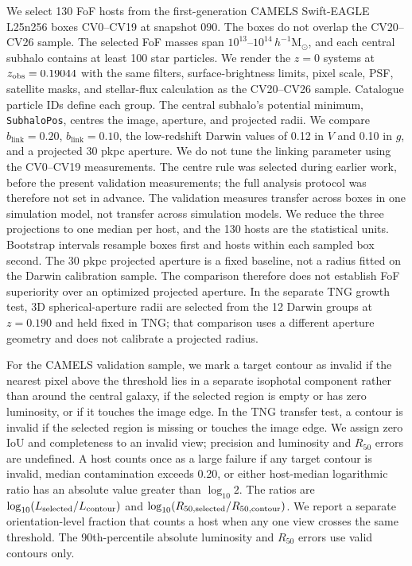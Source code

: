 \documentclass[usenatbib]{mnras}
\begin{document}
We select 130 FoF hosts from the first-generation CAMELS Swift-EAGLE
L25n256 boxes CV0--CV19 at snapshot 090. The boxes do not overlap the
CV20--CV26 sample. The selected FoF masses span
$10^{13}$--$10^{14}\,h^{-1}\mathrm{M}_{\odot}$, and each central subhalo
contains at least 100 star particles. We render the $z=0$ systems at
$z_{\rm obs}=0.19044$ with the same filters, surface-brightness limits,
pixel scale, PSF, satellite masks, and stellar-flux calculation as the
CV20--CV26 sample. Catalogue particle IDs define each group. The central
subhalo's potential minimum, \texttt{SubhaloPos}, centres the image,
aperture, and projected radii. We compare $b_{\mathrm{link}}=0.20$,
$b_{\mathrm{link}}=0.10$, the low-redshift Darwin values of 0.12 in $V$
and 0.10 in $g$, and a projected 30 pkpc aperture. We do not tune
the linking parameter using the CV0--CV19 measurements. The centre rule
was selected during earlier work, before the present validation
measurements; the full analysis protocol was therefore not set in advance.
The validation measures transfer across boxes in one simulation model, not transfer
across simulation models. We reduce the three projections to one median
per host, and the 130 hosts are the statistical units. Bootstrap intervals resample boxes first and
hosts within each sampled box second.
The 30 pkpc projected aperture is a fixed baseline, not a radius fitted
on the Darwin calibration sample. The comparison therefore does not establish
FoF superiority over an optimized projected aperture. In the separate
TNG growth test, 3D spherical-aperture radii are selected from the 12
Darwin groups at $z=0.190$ and held fixed in TNG; that comparison uses a
different aperture geometry and does not calibrate a projected radius.

For the CAMELS validation sample, we mark a target contour as invalid
if the nearest pixel above the threshold lies in a separate isophotal
component rather than around the central galaxy, if the selected region
is empty or has zero luminosity, or if it touches the image edge. In the TNG
transfer test, a contour is invalid if the selected region is missing or
touches the image edge. We assign zero IoU and completeness to an invalid
view; precision and luminosity and $R_{50}$ errors are undefined. A host
counts once as a large failure if any target contour is invalid, median
contamination exceeds 0.20, or either host-median logarithmic ratio has
an absolute value greater than $\log_{10}2$. The ratios are
$\log_{10}(L_{\rm selected}/L_{\rm contour})$ and
$\log_{10}(R_{50,\rm selected}/R_{50,\rm contour})$. We report a separate
orientation-level fraction that counts a host when any one view crosses
the same threshold. The 90th-percentile
absolute luminosity and $R_{50}$ errors use valid contours only.
\end{document}
